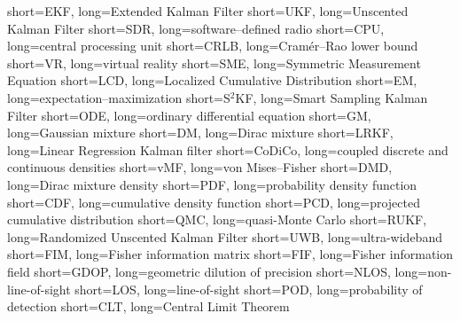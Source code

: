 		{short={EKF},	    	    long={Extended Kalman Filter}}
		{short={UKF},	    	    long={Unscented Kalman Filter}}
		{short={SDR},	    	    long={software--defined radio}}
		{short={CPU},	    	    long={central processing unit}}
		{short={CRLB},	    	  long={Cramér--Rao lower bound}}
		  {short={VR},	    	    long={virtual reality}}
		{short={SME},	    	    long={Symmetric Measurement Equation}}
		{short={LCD},	    	    long={Localized Cumulative Distribution}}
	    {short={EM},	    	    long={expectation--maximization}}
	  {short={S$^2$KF},	      long={Smart Sampling Kalman Filter}}
	  {short={ODE},	    	    long={ordinary differential equation}}
	    {short={GM},	    	    long={Gaussian mixture}}
	    {short={DM},	    	    long={Dirac mixture}}
	  {short={LRKF},	    	  long={Linear Regression Kalman filter}}
	{short={CoDiCo},	      long={coupled discrete and continuous densities}} 
		{short={vMF},	    	    long={von Mises--Fisher}}
		{short={DMD},	    	    long={Dirac mixture density}}
		{short={PDF},	    	    long={probability density function}}
		{short={CDF},	    	    long={cumulative density function}}
		{short={PCD},	    	    long={projected cumulative distribution}}
		{short={QMC},	    	    long={quasi-Monte Carlo}}
		{short={RUKF},	    	  long={Randomized Unscented Kalman Filter}}
		{short={UWB},	    	    long={ultra-wideband}}
		{short={FIM},	    	    long={Fisher information matrix}}
		{short={FIF},	    	    long={Fisher information field}}
		{short={GDOP},	    	  long={geometric dilution of precision}}
		{short={NLOS},	    	  long={non-line-of-sight}}
		{short={LOS},	    	    long={line-of-sight}}
		{short={POD},	    	    long={probability of detection}}
		{short={CLT},	    	    long={Central Limit Theorem}}



